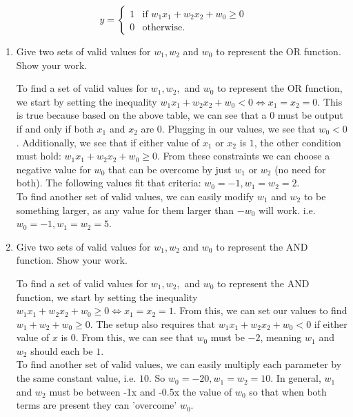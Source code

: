 \documentclass[11pt]{article}
\begin{document}
    $$
        y = 
    \begin{cases} 
        1 & \text{if } w_1 x_1 + w_2 x_2 + w_0 \geq 0 \\
        0 & \text{otherwise}.
    \end{cases}
    $$

    \begin{enumerate}[(1)]
        \item Give two sets of valid values for $w_1, w_2$ and $w_0$ to represent the OR function. Show your work.
        \begin{answertext}{6cm}{}

To find a set of valid values for $w_1, w_2,$ and $w_0$ to represent the OR function, we start by setting the inequality $w_1 x_1 + w_2 x_2 + w_0 < 0 \iff x_1 = x_2 = 0$. This is true because based on the above table, we can see that a $0$ must be output if and only if both $x_1$ and $x_2$ are $0$. Plugging in our values, we see that $w_0 < 0$. Additionally, we see that if either value of $x_1$ or $x_2$ is $1$, the other condition must hold: $w_1 x_1 + w_2 x_2 + w_0 \geq 0$. From these constraints we can choose a negative value for $w_0$ that can be overcome by just $w_1$ or $w_2$ (no need for both). The following values fit that criteria: $w_0 = -1, w_1 = w_2 = 2$.\\

To find another set of valid values, we can easily modify $w_1$ and $w_2$ to be something larger, as any value for them larger than $-w_0$ will work. i.e. $w_0 = -1, w_1 = w_2 = 5$.

        \end{answertext}

        \item Give two sets of valid values for $w_1, w_2$ and $w_0$ to represent the AND function. Show your work.
        
        \begin{answertext}{6cm}{}

To find a set of valid values for $w_1, w_2,$ and $w_0$ to represent the AND function, we start by setting the inequality $w_1 x_1 + w_2 x_2 + w_0 \geq 0 \iff x_1 = x_2 = 1$. From this, we can set our values to find $w_1 + w_2 + w_0 \geq 0$. The setup also requires that $w_1 x_1 + w_2 x_2 + w_0 < 0$ if either value of $x$ is $0$. From this, we can see that $w_0$ must be $-2$, meaning $w_1$ and $w_2$ should each be $1$.\\

To find another set of valid values, we can easily multiply each parameter by the same constant value, i.e. $10$. So $w_0 = -20, w_1 = w_2 = 10$. In general, $w_1$ and $w_2$ must be between -1x and -0.5x the value of $w_0$ so that when both terms are present they can 'overcome' $w_0$. 


\end{answertext}
\end{enumerate}
\end{document}
